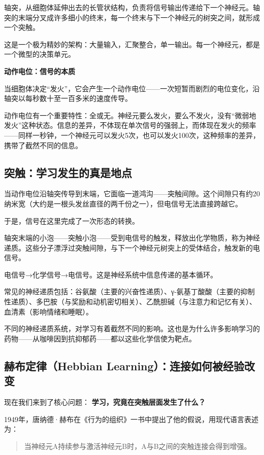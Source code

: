 \documentclass[11pt]{article}
\begin{document}
轴突，从细胞体延伸出去的长管状结构，负责将信号输出传递给下一个神经元。轴突的末端分叉成许多细小的终末，每一个终末与下一个神经元的树突之间，就形成一个突触。

这是一个极为精妙的架构：大量输入，汇聚整合，单一输出。每一个神经元，都是一个微型的决策单元。

\textbf{动作电位：信号的本质}

当细胞体决定“发火”，它会产生一个动作电位——一次短暂而剧烈的电位变化，沿轴突以每秒数十至一百多米的速度传导。

动作电位有一个重要特性：全或无。神经元要么发火，要么不发火，没有“微弱地发火”这种状态。信息的差异，不体现在单次信号的强弱上，而体现在发火的频率——同样一秒钟，一个神经元可以发火5次，也可以发火100次，这种频率的差异，携带了截然不同的信息。
\subsection{突触：学习发生的真是地点}
\label{sec:org7ad33e6}

当动作电位沿轴突传导到末端，它面临一道鸿沟——突触间隙。这个间隙只有约20纳米宽（大约是一根头发丝直径的两千份之一），但电信号无法直接跨越它。

于是，信号在这里完成了一次形态的转换。

轴突末端的小泡——突触小泡——受到电信号的触发，释放出化学物质，称为神经递质。这些分子漂浮过突触间隙，与下一个神经元树突上的受体结合，触发新的电信号。

电信号→化学信号→电信号。这是神经系统中信息传递的基本循环。

常见的神经递质包括：谷氨酸（主要的兴奋性递质）、γ-氨基丁酸酸（主要的抑制性递质）、多巴胺（与奖励和动机密切相关）、乙酰胆碱（与注意力和记忆有关）、血清素（影响情绪和睡眠）。

不同的神经递质系统，对学习有着截然不同的影响。这也是为什么许多影响学习的药物——从咖啡因到抗抑郁药——都以这些化学信使为靶点。
\subsection{赫布定律（Hebbian Learning）：连接如何被经验改变}
\label{sec:org319edbf}

现在我们来到了核心问题： \textbf{学习，究竟在突触层面发生了什么？}

1949年，唐纳德·赫布在《行为的组织》一书中提出了他的假说，用现代语言表述为：

\begin{quote}
当神经元A持续参与激活神经元B时，A与B之间的突触连接会得到增强。
\end{quote}
\end{document}
